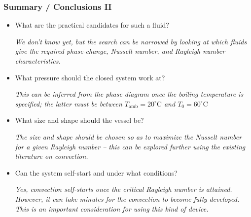 \documentclass[10pt,mathserif]{beamer}
\newcommand{\Tamb}{T_{\mathrm{amb}}}
\begin{document}
\begin{frame}
\frametitle{Summary / Conclusions II}


\begin{itemize}[<+>]
\item{What are the practical candidates for such a fluid?

{\emph{We don't know yet, but the search can be narrowed by looking at which fluids give the required phase-change, Nusselt number, and Rayleigh number characteristics.}}}

\item{What pressure should the closed system work at?

{\emph{This can be inferred from the phase diagram once the boiling temperature is specified; the latter must be between $\Tamb=20^\circ\mathrm{C}$ and $T_0=60^\circ\mathrm{C}$}}}

\item{What size and shape should the vessel be?

{\emph{The size and shape should be chosen so as to maximize the Nusselt number for a given Rayleigh number -- this can be explored further using the existing literature on convection.}}}

\item{Can the system self-start and under what conditions?

{\emph{Yes, convection self-starts once the critical Rayleigh number is attained.  However, it can take minutes for the convection to become fully developed.  This is an important consideration for using this kind of device.}}}

\end{itemize}
\end{frame}
\end{document}
